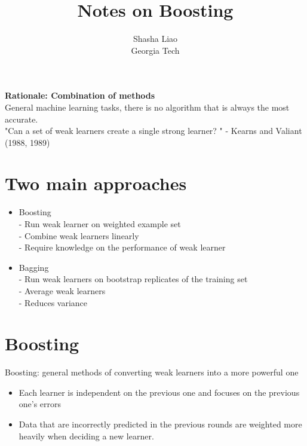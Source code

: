 \documentclass[twoside,12pt]{article}
\begin{document}
\title{Notes on Boosting}
\author {Shasha Liao \\ Georgia Tech}
\maketitle
\textbf{Rationale: Combination of methods} \\
General machine learning tasks, there is no algorithm that is always the most accurate. \\
"Can a set of weak learners create a single strong learner? " - Kearns and Valiant (1988, 1989) \\

\section{Two main approaches}
\begin{itemize}
\item Boosting \\
- Run weak learner on weighted example set \\
- Combine weak learners linearly \\
- Require knowledge on the performance of weak learner 
\item Bagging \\
- Run weak learners on bootstrap replicates of the training set \\
- Average weak learners \\
- Reduces variance
\end{itemize}

\section{Boosting}
Boosting: general methods of converting weak learners into a more powerful one
\begin{itemize}
\item Each learner is independent on the previous one and focuses on the previous one's errors
\item Data that are incorrectly predicted in the previous rounds are weighted more heavily when deciding a new learner.
\end{itemize}
\end{document}
